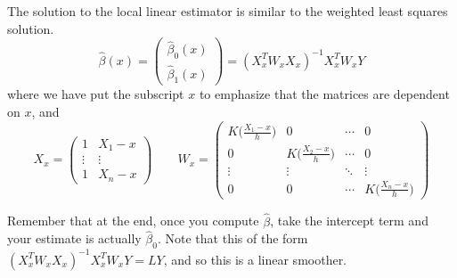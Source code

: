   \begin{theorem}
    \label{thm:weighted-least-squares}
    The solution to the local linear estimator is similar to the weighted least squares solution. 
    \begin{equation}
      \hat{\beta}(x) = \begin{pmatrix} \hat{\beta}_0 (x) \\ \hat{\beta}_1 (x) \end{pmatrix} = (X_x^T W_x X_x)^{-1} X_x^T W_x Y
    \end{equation}
    where we have put the subscript $x$ to emphasize that the matrices are dependent on $x$, and 
    \begin{equation}
      X_x = \begin{pmatrix} 1 & X_1 - x \\ \vdots & \vdots \\ 1 & X_n - x \end{pmatrix} \qquad W_x = \begin{pmatrix} K \big( \frac{X_1 - x}{h} \big) & 0 & \cdots & 0 \\ 0 & K \big( \frac{X_2 - x}{h} \big) & \cdots & 0 \\ \vdots & \vdots & \ddots & \vdots \\ 0 & 0 & \cdots & K \big( \frac{X_n - x}{h} \big) \end{pmatrix}
    \end{equation}
  \end{theorem}

  Remember that at the end, once you compute $\hat{\beta}$, take the intercept term and your estimate is actually $\hat{\beta}_0$. Note that this of the form $(X_x^T W_x X_x)^{-1} X_x^T W_x Y = LY$, and so this is a linear smoother. 

